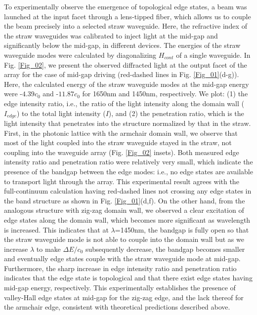 \documentclass[prl,twocolumn,showpacs,amsmath,amssymb,superscriptaddress]{revtex4-1}
\begin{document}
To experimentally observe the emergence of topological edge states, a beam was launched at the input facet through a lens-tipped fiber, which allows us to couple the beam precisely into a selected straw waveguide.
Here, the refractive index of the straw waveguides was calibrated to inject light at the mid-gap and significantly below the mid-gap, in different devices.
The energies of the straw waveguide modes were calculated by diagonalizing $H_{cont}$ of a single waveguide.
In Fig. \ref{Fig_02}, we present the observed diffracted light at the output facet of the array for the case of mid-gap driving (red-dashed lines in Fig. \ref{Fig_01}(d-g)).
Here, the calculated energy of the straw waveguide modes at the mid-gap energy were -$4.39c_{0}$ and -$11.87c_{0}$ for 1650nm and 1450nm, respectively.
We plot: (1) the edge intensity ratio, i.e., the ratio of the light intensity along the domain wall ($I_{edge}$) to the total light intensity ($I$), and (2) the penetration ratio, which is the light intensity that penetrates into the structure normalized by that in the straw. 
First, in the photonic lattice with the armchair domain wall, we observe that most of the light coupled into the straw waveguide stayed in the straw, not coupling into the waveguide array (Fig. \ref{Fig_02} insets).
Both measured edge intensity ratio and penetration ratio were relatively very small, which indicate the presence of the bandgap between the edge modes: i.e., no edge states are available to transport light through the array. This experimental result agrees with the full-continuum calculation having red-dashed lines not crossing any edge states in the band structure as shown in Fig. \ref{Fig_01}(d,f).
On the other hand, from the analogous structure with zig-zag domain wall, we observed a clear excitation of edge states along the domain wall, which becomes more significant as wavelength is increased.
This indicates that at $\lambda$=1450nm, the bandgap is fully open so that the straw waveguide mode is not able to couple into the domain wall but as we increase $\lambda$ to make $\Delta E/c_{0}$ subsequently decrease, the bandgap becomes smaller and eventually edge states couple with the straw waveguide mode at mid-gap.
Furthermore, the sharp increase in edge intensity ratio and penetration ratio indicates that the edge state is topological and that there exist edge states having mid-gap energy, respectively.  This experimentally establishes the presence of valley-Hall edge states at mid-gap for the zig-zag edge, and the lack thereof for the armchair edge, consistent with theoretical predictions described above.
\end{document}
